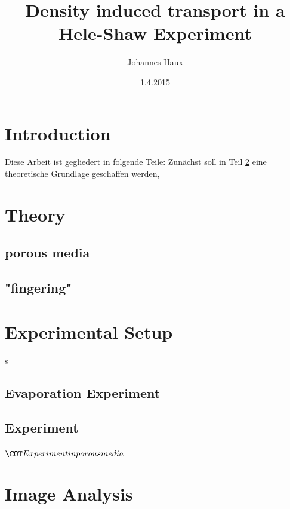 \documentclass[oneside, a4paper, DIV=11]{scrartcl}
\title{Density induced transport in a Hele-Shaw Experiment}
\author{Johannes Haux}
\date{1.4.2015}
\begin{document}
\maketitle

\section{Introduction}

Diese Arbeit ist gegliedert in folgende Teile: Zunächst soll in Teil \ref{sec:theo} eine theoretische Grundlage geschaffen werden, 



\section{Theory}
\label{sec:theo}
\subsection{porous media}
\label{theo:por}
\subsection{"fingering"}
\label{theo:fing}
\subsection{}


\section{Experimental Setup}s
\label{sec:set}
\subsection{Evaporation Experiment}
\label{set:eva}
\subsection{\COT Experiment}
\label{set:cot}
\subsubsection{\(\COT Experiment in porous media\)}
\label{set:cpm}

\section{Image Analysis}
\label{sec:ima}
\end{document}
